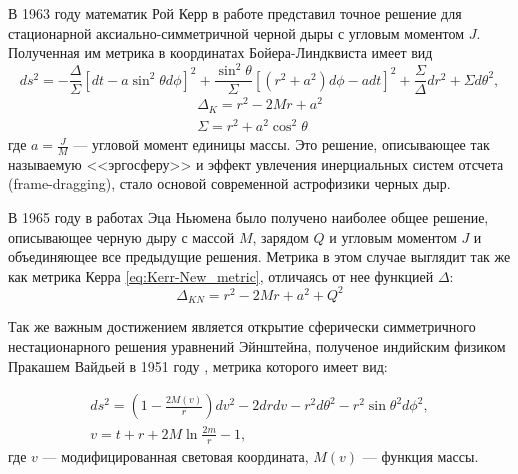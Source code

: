 
В 1963 году математик Рой Керр в работе \cite{kerr1963gravitational} представил точное решение для стационарной аксиально-симметричной черной дыры с угловым моментом \(J\). Полученная им метрика в координатах Бойера-Линдквиста имеет вид
\begin{equation}
	\label{eq:Kerr-New_metric}
	ds^2=-\frac{\Delta}{\Sigma}[dt-a\sin^2\theta d\phi]^2+\frac{\sin^2\theta}{\Sigma}[(r^2+a^2)d\phi -adt]^2  +\frac{\Sigma}{\Delta}dr^2+\Sigma d\theta^2\!,
\end{equation}
\begin{subequations}
    \label{eq:Kerr_DS}
    \begin{gather}
        \Delta_K = r^2-2Mr+a^2 \label{eq:Kerr_D} \\
        \Sigma= r^2+a^2\cos^2\theta \label{eq:Kerr-New_S}
    \end{gather}
\end{subequations}
где \(a=\frac{J}{M}\) — угловой момент единицы массы.
Это решение, описывающее так называемую <<эргосферу>> и эффект увлечения инерциальных систем отсчета (frame-dragging), стало основой современной астрофизики черных дыр.

В 1965 году в работах Эца Ньюмена \cite{newmanNoteKerrSpinningParticle1965, newmanMetricRotatingCharged1965} было получено наиболее общее решение, описывающее черную дыру с массой \(M\), зарядом \(Q\) и угловым моментом \(J\) и объединяющее все предыдущие решения. Метрика в этом случае выглядит так же как метрика Керра \cref{eq:Kerr-New_metric}, отличаясь от нее функцией \(\Delta\):
\begin{equation}
    \label{eq:Kerr-New_D}
    \Delta_{KN} = r^2-2Mr+a^2+Q^2
\end{equation}

Так же важным достижением является открытие сферически симметричного нестационарного решения уравнений Эйнштейна, полученое индийским физиком Пракашем Вайдьей в 1951 году \cite{vaidya1951nonstatic, vaidya1951gravitational}, метрика которого имеет вид:

\begin{subequations}
    \label{eq:Vaidya}
    \begin{gather}
    ds^2=(1-\frac{2M(v)}{r})dv^2-2drdv-r^2d\theta^2 - r^2\sin{\theta}^2d\phi^2, \label{eq:Vaidya_metric}\\
    v=t+r + 2M\ln{\frac{2m}{r}-1}, \label{eq:v}
    \end{gather}
\end{subequations}
где \(v\) — модифицированная световая координата, \(M(v)\) — функция массы.

